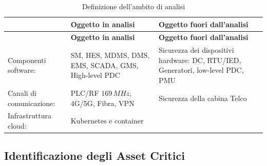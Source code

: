 \renewcommand{\arraystretch}{1.5}
\begin{longtable}[!h]{p{5cm}p{5cm}p{5cm}}
        
    \caption{Definizione dell'ambito di analisi} 
    \label{tab:def-ambito}\\
    
    \hline
    &  \textbf{Oggetto in analisi} & \textbf{Oggetto fuori dall'analisi}\\
    \hline
    \endfirsthead
    
    \hline
    &  \textbf{Oggetto in analisi} & \textbf{Oggetto fuori dall'analisi}\\
    \hline
    \endhead

    Componenti software: &   SM, HES, MDMS, DMS, EMS, SCADA, GMS, High-level PDC & Sicurezza dei dispositivi hardware: DC, RTU/IED, Generatori, low-level PDC, PMU\\
    
    Canali di comunicazione: &  PLC/RF $169\,MHz$, 4G/5G, Fibra, VPN&  Sicurezza della cabina Telco\\
         
    Infrastruttura cloud:&  Kubernetes e container & \\

    
    \hline
\end{longtable}

\newpage
\subsection{Identificazione degli Asset Critici}



    
         
